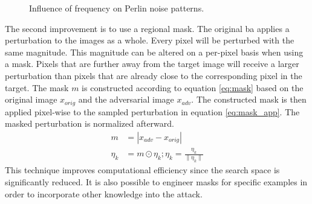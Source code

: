 \begin{figure}
	\centering
	\quad
	\quad
	\caption[Influence of frequency on Perlin noise]{Influence of frequency on Perlin noise patterns.}
	\label{fig:perlin_noise_frequencies}
\end{figure}

\newpage
The second improvement is to use a regional mask. The original \gls{ba} applies a perturbation to the images as a whole. Every pixel will be perturbed with the same magnitude. This magnitude can be altered on a per-pixel basis when using a mask. Pixels that are further away from the target image will receive a larger perturbation than pixels that are already close to the corresponding pixel in the target. The mask $m$ is constructed according to equation \ref{eq:mask} based on the original image $x_{orig}$ and the adversarial image $x_{adv}$. The constructed mask is then applied pixel-wise to the sampled perturbation in equation \ref{eq:mask_app}. The masked perturbation is normalized afterward.\\ 
\begin{align}
m &= | x_{adv} - x_{orig}| \label{eq:mask}\\
\eta_{k} &= m \odot \eta_k; \eta_k = \frac{\eta_k}{\| \eta_k \|} \label{eq:mask_app}
\end{align}
This technique improves computational efficiency since the search space is significantly reduced. It is also possible to engineer masks for specific examples in order to incorporate other knowledge into the attack.\\

